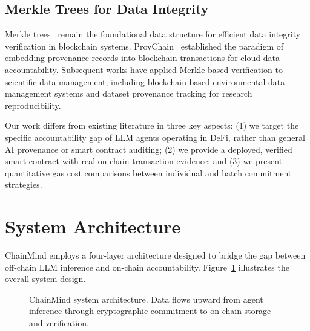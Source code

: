 \documentclass[manuscript,nonacm]{acmart}
\begin{document}
\subsection{Merkle Trees for Data Integrity}

Merkle trees~\cite{merkle1987} remain the foundational data structure for efficient data integrity verification in blockchain systems. ProvChain~\cite{provchain2017} established the paradigm of embedding provenance records into blockchain transactions for cloud data accountability. Subsequent works have applied Merkle-based verification to scientific data management, including blockchain-based environmental data management systems and dataset provenance tracking for research reproducibility.

Our work differs from existing literature in three key aspects: (1) we target the specific accountability gap of LLM agents operating in DeFi, rather than general AI provenance or smart contract auditing; (2) we provide a deployed, verified smart contract with real on-chain transaction evidence; and (3) we present quantitative gas cost comparisons between individual and batch commitment strategies.


\section{System Architecture}
\label{sec:architecture}

ChainMind employs a four-layer architecture designed to bridge the gap between off-chain LLM inference and on-chain accountability. Figure~\ref{fig:architecture} illustrates the overall system design.

\begin{figure}[h]
\centering
{}
\caption{ChainMind system architecture. Data flows upward from agent inference through cryptographic commitment to on-chain storage and verification.}
\label{fig:architecture}
\end{figure}
\end{document}
